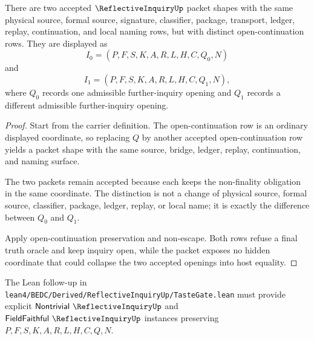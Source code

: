 \begin{theorem}
\label{thm:reflective-inquiry-nontrivial-witness-route}
There are two accepted $\ReflectiveInquiryUp$ packet shapes with the same physical source, formal source, signature, classifier, package, transport, ledger, replay, continuation, and local naming rows, but with distinct open-continuation rows. They are displayed as
$$
I_0=(P,F,S,K,A,R,L,H,C,Q_0,N)
$$
and
$$
I_1=(P,F,S,K,A,R,L,H,C,Q_1,N),
$$
where $Q_0$ records one admissible further-inquiry opening and $Q_1$ records a different admissible further-inquiry opening.
\end{theorem}
\begin{proof}
Start from the carrier definition. The open-continuation row is an ordinary displayed coordinate, so replacing $Q$ by another accepted open-continuation row yields a packet shape with the same source, bridge, ledger, replay, continuation, and naming surface.

The two packets remain accepted because each keeps the non-finality obligation in the same coordinate. The distinction is not a change of physical source, formal source, classifier, package, ledger, replay, or local name; it is exactly the difference between $Q_0$ and $Q_1$.

Apply open-continuation preservation and non-escape. Both rows refuse a final truth oracle and keep inquiry open, while the packet exposes no hidden coordinate that could collapse the two accepted openings into host equality.
\end{proof}



The Lean follow-up in \texttt{lean4/BEDC/Derived/ReflectiveInquiryUp/TasteGate.lean} must provide explicit $\mathsf{Nontrivial}\ \ReflectiveInquiryUp$ and $\mathsf{FieldFaithful}\ \ReflectiveInquiryUp$ instances preserving $P,F,S,K,A,R,L,H,C,Q,N$.

